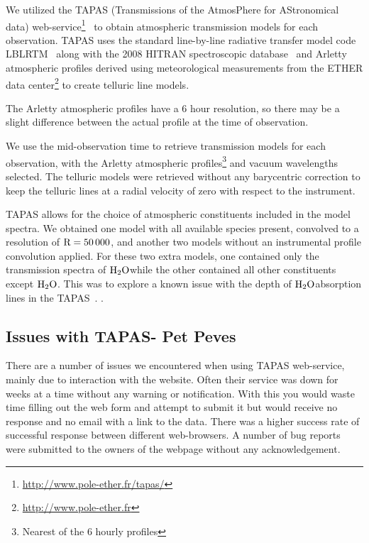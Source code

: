 We utilized the TAPAS (Transmissions of the AtmosPhere for AStronomical data) web-service\footnote{\url{http://www.pole-ether.fr/tapas/}}~\citep{bertaux_tapas_2014} to obtain atmospheric transmission models for each observation. TAPAS uses the standard line-by-line radiative transfer model code LBLRTM~\citep{clough_linebyline_1995} along with the 2008 HITRAN spectroscopic database~\citep{rothman_hitran_2009} and Arletty atmospheric profiles derived using meteorological measurements from the ETHER data center\footnote{\url{http://www.pole-ether.fr}} to create telluric line models.

The Arletty atmospheric profiles have a 6 hour resolution, so there may be a slight difference between the actual profile at the time of observation.

We use the mid-observation time to retrieve transmission models for each observation, with the Arletty atmospheric profiles\footnote{Nearest of the 6 hourly profiles} and vacuum wavelengths selected. The telluric models were retrieved without any barycentric correction to keep the telluric lines at a radial velocity of zero with respect to the instrument.

TAPAS allows for the choice of atmospheric constituents included in the model spectra. We obtained one model with all available species present, convolved to a resolution of \(\rm R=50\,000\), and another two models without an instrumental profile convolution applied. For these two extra models, one contained only the transmission spectra of \(\rm H_{2}O\)while the other contained all other constituents except \(\rm H_{2}O\). This was to explore a known issue with the depth of \(\rm H_{2}O\)absorption lines in the TAPAS~\citet{bertaux_tapas_2014}. .


\subsection{Issues with TAPAS-  Pet Peves}
There are a number of issues we encountered when using TAPAS web-service, mainly due to interaction with the website. Often their service was down for weeks at a time without any warning or notification. With this you would waste time filling out the web form and attempt to submit it but would receive no response and no email with a link to the data. There was a higher success rate of successful response between different web-browsers. A number of bug reports were submitted to the owners of the webpage without any acknowledgement.

